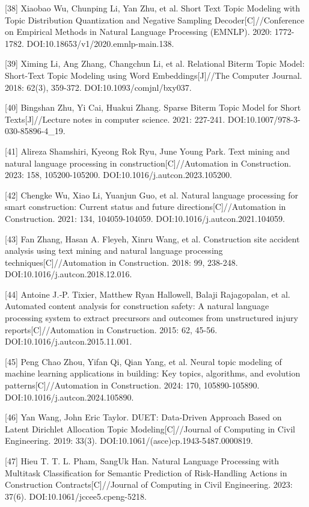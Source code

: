 \documentclass{article}
\begin{document}
[38] Xiaobao Wu, Chunping Li, Yan Zhu, et al. Short Text Topic Modeling with Topic Distribution Quantization and Negative Sampling Decoder[C]//Conference on Empirical Methods in Natural Language Processing (EMNLP). 2020: 1772-1782. DOI:10.18653/v1/2020.emnlp-main.138.

[39] Ximing Li, Ang Zhang, Changchun Li, et al. Relational Biterm Topic Model: Short-Text Topic Modeling using Word Embeddings[J]//The Computer Journal. 2018: 62(3), 359-372. DOI:10.1093/comjnl/bxy037.

[40] Bingshan Zhu, Yi Cai, Huakui Zhang. Sparse Biterm Topic Model for Short Texts[J]//Lecture notes in computer science. 2021: 227-241. DOI:10.1007/978-3-030-85896-4\_19.

[41] Alireza Shamshiri, Kyeong Rok Ryu, June Young Park. Text mining and natural language processing in construction[C]//Automation in Construction. 2023: 158, 105200-105200. DOI:10.1016/j.autcon.2023.105200.

[42] Chengke Wu, Xiao Li, Yuanjun Guo, et al. Natural language processing for smart construction: Current status and future directions[C]//Automation in Construction. 2021: 134, 104059-104059. DOI:10.1016/j.autcon.2021.104059.

[43] Fan Zhang, Hasan A. Fleyeh, Xinru Wang, et al. Construction site accident analysis using text mining and natural language processing techniques[C]//Automation in Construction. 2018: 99, 238-248. DOI:10.1016/j.autcon.2018.12.016.

[44] Antoine J.‐P. Tixier, Matthew Ryan Hallowell, Balaji Rajagopalan, et al. Automated content analysis for construction safety: A natural language processing system to extract precursors and outcomes from unstructured injury reports[C]//Automation in Construction. 2015: 62, 45-56. DOI:10.1016/j.autcon.2015.11.001.

[45] Peng Chao Zhou, Yifan Qi, Qian Yang, et al. Neural topic modeling of machine learning applications in building: Key topics, algorithms, and evolution patterns[C]//Automation in Construction. 2024: 170, 105890-105890. DOI:10.1016/j.autcon.2024.105890.

[46] Yan Wang, John Eric Taylor. DUET: Data-Driven Approach Based on Latent Dirichlet Allocation Topic Modeling[C]//Journal of Computing in Civil Engineering. 2019: 33(3). DOI:10.1061/(asce)cp.1943-5487.0000819.

[47] Hieu T. T. L. Pham, SangUk Han. Natural Language Processing with Multitask Classification for Semantic Prediction of Risk-Handling Actions in Construction Contracts[C]//Journal of Computing in Civil Engineering. 2023: 37(6). DOI:10.1061/jccee5.cpeng-5218.
\end{document}
